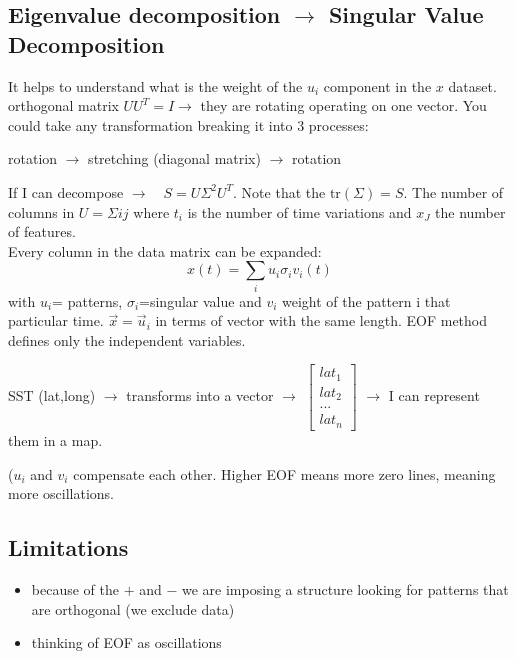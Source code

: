 \subsection{Eigenvalue decomposition $\rightarrow$ Singular Value Decomposition}
It helps to understand what is the weight of the $u_i$ component in the $x$ dataset.
\\


orthogonal matrix $UU^T=I\rightarrow$ they are rotating operating on one vector. You could take any transformation breaking it into 3 processes:
\begin{center}
	rotation $\rightarrow$ stretching (diagonal matrix) $\rightarrow$ rotation
\end{center}
If I can decompose $\rightarrow \quad S=U\Sigma^2U^T$. Note that the $\text{tr}(\Sigma)=S$. The number of columns in $U=\Sigma ij$ where $t_i$ is the number of time variations and $x_J$ the number of features.
\\


Every column in the data matrix can be expanded:
\begin{equation*}
	x(t)=\sum_iu_i\sigma_iv_i(t)
\end{equation*}
with $u_i$= patterns, $\sigma_i$=singular value and $v_i$ weight of the pattern i that particular time. $\vec{x}=\vec{u}_i$ in terms of vector with the same length. EOF method defines only the independent variables.

SST (lat,long) $\rightarrow$ transforms into a vector $\rightarrow$ $\begin{bmatrix}
		lat_1 \\
		lat_2 \\
		...   \\
		lat_n
	\end{bmatrix}$ $\rightarrow$ I can represent them in a map.

($u_i$ and $v_i$ compensate each other. Higher EOF means more zero lines, meaning more oscillations.
\subsection{Limitations}
\begin{itemize}
	\item because of the $+$ and $-$ we are imposing a structure looking for patterns that are orthogonal (we exclude data)
	\item thinking of EOF as oscillations
\end{itemize}

